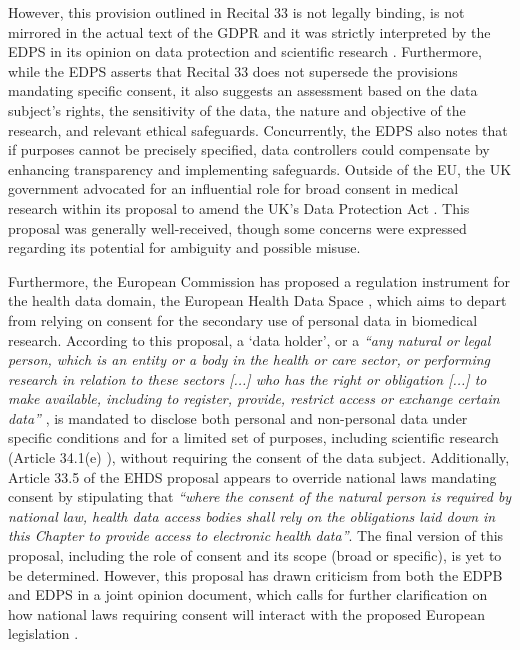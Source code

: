 However, this provision outlined in Recital 33 \citeyearpar{noauthor_regulation_2016} is not legally binding, is not mirrored in the actual text of the GDPR and it was strictly interpreted by the EDPS in its opinion on data protection and scientific research \citep{european_data_protection_supervisor_preliminary_2020}.
Furthermore, while the EDPS asserts that Recital 33 does not supersede the provisions mandating specific consent, it also suggests an assessment based on the data subject's rights, the sensitivity of the data, the nature and objective of the research, and relevant ethical safeguards. Concurrently, the EDPS also notes that if purposes cannot be precisely specified, data controllers could compensate by enhancing transparency and implementing safeguards.
Outside of the EU, the UK government advocated for an influential role for broad consent in medical research within its proposal to amend the UK's Data Protection Act \citep{uk_government_consultation_2022}.
This proposal was generally well-received, though some concerns were expressed regarding its potential for ambiguity and possible misuse.

Furthermore, the European Commission has proposed a regulation instrument for the health data domain, the European Health Data Space \citeyearpar{noauthor_proposal_2022}, which aims to depart from relying on consent for the secondary use of personal data in biomedical research.
According to this proposal, a `data holder', or a \textit{``any natural or legal person, which is an entity or a body in the health or care sector, or performing research in relation to these sectors [...] who has the right or obligation [...] to make available, including to register, provide, restrict access or exchange certain data''} \citeyearpar{noauthor_proposal_2022}, is mandated to disclose both personal and non-personal data under specific conditions and for a limited set of purposes, including scientific research (Article 34.1(e) \citeyearpar{noauthor_proposal_2022}), without requiring the consent of the data subject.
Additionally, Article 33.5 of the EHDS proposal \citeyearpar{noauthor_proposal_2022} appears to override national laws mandating consent by stipulating that \textit{``where the consent of the natural person is required by national law, health data access bodies shall rely on the obligations laid down in this Chapter to provide access to electronic health data''}.
The final version of this proposal, including the role of consent and its scope (broad or specific), is yet to be determined.
However, this proposal has drawn criticism from both the EDPB and EDPS in a joint opinion document, which calls for further clarification on how national laws requiring consent will interact with the proposed European legislation \citeyearpar{noauthor_edpbedps_2022}.

